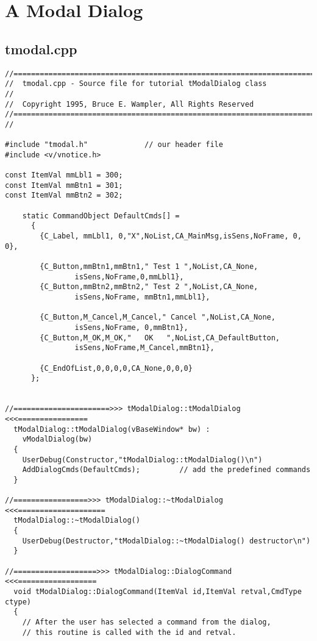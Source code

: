 \section{A Modal Dialog}

\subsection*{tmodal.cpp}

%
\footnotesize
\begin{verbatim}
//========================================================================
//  tmodal.cpp - Source file for tutorial tModalDialog class
//
//  Copyright 1995, Bruce E. Wampler, All Rights Reserved
//========================================================================
//

#include "tmodal.h"             // our header file
#include <v/vnotice.h>

const ItemVal mmLbl1 = 300;
const ItemVal mmBtn1 = 301;
const ItemVal mmBtn2 = 302;

    static CommandObject DefaultCmds[] =
      {
        {C_Label, mmLbl1, 0,"X",NoList,CA_MainMsg,isSens,NoFrame, 0, 0},
        
        {C_Button,mmBtn1,mmBtn1," Test 1 ",NoList,CA_None,
                isSens,NoFrame,0,mmLbl1},
        {C_Button,mmBtn2,mmBtn2," Test 2 ",NoList,CA_None,
                isSens,NoFrame, mmBtn1,mmLbl1},

        {C_Button,M_Cancel,M_Cancel," Cancel ",NoList,CA_None,
                isSens,NoFrame, 0,mmBtn1},
        {C_Button,M_OK,M_OK,"   OK   ",NoList,CA_DefaultButton,
                isSens,NoFrame,M_Cancel,mmBtn1},

        {C_EndOfList,0,0,0,0,CA_None,0,0,0}
      };


//======================>>> tModalDialog::tModalDialog <<<================
  tModalDialog::tModalDialog(vBaseWindow* bw) :
    vModalDialog(bw)
  {
    UserDebug(Constructor,"tModalDialog::tModalDialog()\n")
    AddDialogCmds(DefaultCmds);         // add the predefined commands
  }

//=================>>> tModalDialog::~tModalDialog <<<====================
  tModalDialog::~tModalDialog()
  {
    UserDebug(Destructor,"tModalDialog::~tModalDialog() destructor\n")
  }

//===================>>> tModalDialog::DialogCommand <<<==================
  void tModalDialog::DialogCommand(ItemVal id,ItemVal retval,CmdType ctype)
  {
    // After the user has selected a command from the dialog,
    // this routine is called with the id and retval.


\end{verbatim}
